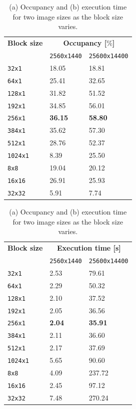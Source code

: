 \documentclass[11pt,a4paper]{article}
\begin{document}
\begin{table}[H]
	\begin{subtable}{.5\linewidth}
		\centering
		\begin{tabular}{|l|l|l|} 
			\hline
			\textbf{Block size} & \multicolumn{2}{|c|}{\textbf{Occupancy [$\%$]}} \\
			\cline{2-3}
			 & \texttt{2560x1440} & \texttt{25600x14400} \\ [0.2ex] 
			\hline\hline
			\texttt{32x1} & 18.05 & 18.81 \\ 
			\texttt{64x1} & 25.41 & 32.65 \\
			\texttt{128x1} & 31.82 & 51.52 \\
			\texttt{192x1} & 34.85 & 56.01 \\
			\texttt{256x1} & \textbf{36.15} & \textbf{58.80} \\
			\texttt{384x1} & 35.62 & 57.30 \\
			\texttt{512x1} & 28.76 & 52.37 \\
			\texttt{1024x1} & 8.39 & 25.50 \\
			\texttt{8x8} & 19.04 & 20.12 \\
			\texttt{16x16} & 26.91 & 25.93 \\
			\texttt{32x32} & 5.91 & 7.74 \\ [0.2ex] 
			\hline
		\end{tabular}
		\caption{}
	\end{subtable}%
	\begin{subtable}{.5\linewidth}
		\centering
		\begin{tabular}{|l|l|l|} 
			\hline
			\textbf{Block size} & \multicolumn{2}{|c|}{\textbf{Execution time [s]}} \\
			\cline{2-3}
			& \texttt{2560x1440} & \texttt{25600x14400} \\ [0.2ex] 
			\hline\hline
			\texttt{32x1} & 2.53 & 79.61 \\ 
			\texttt{64x1} & 2.29 & 50.32 \\
			\texttt{128x1} & 2.10 & 37.52 \\
			\texttt{192x1} & 2.05 & 36.56 \\
			\texttt{256x1} & \textbf{2.04} & \textbf{35.91} \\
			\texttt{384x1} & 2.11 & 36.60 \\
			\texttt{512x1} & 2.17 & 37.69 \\
			\texttt{1024x1} & 5.65 & 90.60 \\
			\texttt{8x8} & 4.09 & 237.72 \\
			\texttt{16x16} & 2.45 & 97.12 \\
			\texttt{32x32} & 7.48 & 270.24 \\ [0.2ex] 
			\hline
		\end{tabular}
		\caption{}
	\end{subtable} 
	\caption{(a) Occupancy and (b) execution time for two image sizes as the block size varies.}
	\label{tab:block-size}
\end{table}
\end{document}
